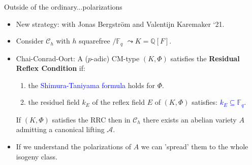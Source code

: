 \documentclass[usenames,dvipsnames,handout]{beamer}
\def\Q{\mathbb{Q}}
\def\F{\mathbb{F}}
\DeclareMathOperator{\Hom}{Hom}
\newcommand{\cG}{\mathcal{G}}
\newcommand{\cA}{{\mathcal A}}
\newcommand{\cC}{{\mathcal C}}
\newcommand{\vphi}{\varphi}
\newcommand{\set}[1]{\left\lbrace#1\right\rbrace }
\newcommand{\red}[1]{\textcolor{red}{#1}}
\newcommand{\blue}[1]{\textcolor{blue}{#1}}
\begin{document}
\begin{frame}{ Outside of the ordinary...polarizations } 
	\begin{itemize}
	\item New strategy: with Jonas Bergstr\"om and Valentijn Karemaker `21.
\pause
	\item Consider $\cC_h$ with $h$ squarefree $/\F_q$ $\leadsto K=\Q[F]$. 
\pause 
    \item Chai-Conrad-Oort: A ($p$-adic) CM-type $(K,\Phi)$ satisfies the {\bf Residual Reflex Condition} if:
    \begin{enumerate}[1.]
\pause 
    \item the \blue{Shimura-Taniyama formula} holds for $\Phi$.
\pause
    \item the residuel field $k_E$ of the reflex field $E$ of $(K,\Phi)$ satisfies: \blue{$k_E \subseteq \F_q$}.
    \end{enumerate}
\pause
    \begin{theorem}
    If $(K,\Phi)$ satisfies the RRC then in $\cC_h$ there exists an abelian variety $A$ admitting a canonical lifting $\cA$. 
    \end{theorem}
\pause
    \item If we understand the polarizations of $A$ we can 'spread' them to the whole isogeny class.
    \end{itemize}
\end{frame}

\end{document}
